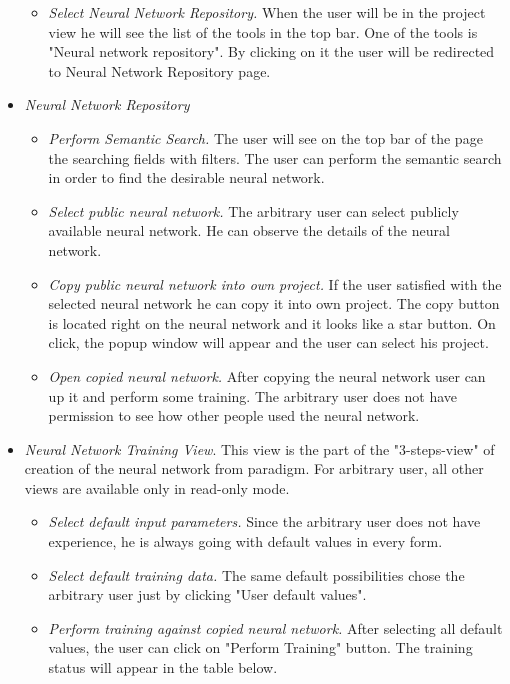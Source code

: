 \begin{itemize}
\begin{itemize}
\item \emph{Select Neural Network Repository.} When the user will be in the project view he will see the list of the tools in the top bar. One of the tools is "Neural network repository". By clicking on it the user will be redirected to Neural Network Repository page.
\end{itemize}
\item \emph{Neural Network Repository}
\begin{itemize}
\item \emph{Perform Semantic Search.} The user will see on the top bar of the page the searching fields with filters. The user can perform the semantic search in order to find the desirable neural network. 
\item \emph{Select public neural network.} The arbitrary user can select publicly available neural network. He can observe the details of the neural network.
\item \emph{Copy public neural network into own project.} If the user satisfied with the selected neural network he can copy it into own project. The copy button is located right on the neural network and it looks like a star button. On click, the popup window will appear and the user can select his project.
\item \emph{Open copied neural network.} After copying the neural network user can up it and perform some training. The arbitrary user does not have permission to see how other people used the neural network.
\end{itemize}

\item \emph{Neural Network Training View}. This view is the part of the "3-steps-view" of creation of the neural network from paradigm. For arbitrary user, all other views are available only in read-only mode.
\begin{itemize}
\item \emph{Select default input parameters.} Since the arbitrary user does not have experience, he is always going with default values in every form.
\item \emph{Select default training data.} The same default possibilities chose the arbitrary user just by clicking "User default values".
\item \emph{Perform training against copied neural network.} After selecting all default values, the user can click on "Perform Training" button. The training status will appear in the table below.
\end{itemize}


\end{itemize}
